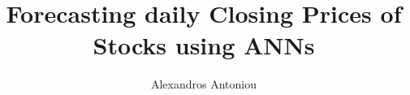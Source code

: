 \author{Alexandros Antoniou}
\title{\bfseries Forecasting daily Closing Prices of Stocks using ANNs}
